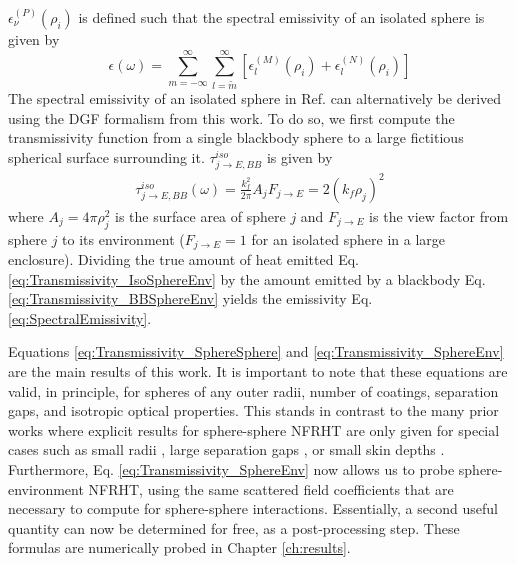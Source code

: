 $\epsilon_{\nu}^{(P)}(\rho_{i})$ is defined such that the spectral emissivity of an isolated sphere\cite{Kattawar1970} is given by
%
\begin{equation}\label{eq:SpectralEmissivity}
\epsilon\left( \omega \right)
= \sum\limits_{m=-\infty}^{\infty} \sum\limits_{l=\widetilde{m}}^{\infty}
\left[ \epsilon_{l}^{(M)}(\rho_{i}) + \epsilon_{l}^{(N)}(\rho_{i}) \right]
\end{equation}
%
The spectral emissivity of an isolated sphere in Ref.  can alternatively be derived using the DGF formalism from this work. To do so, we first compute the transmissivity function from a single blackbody sphere to a large fictitious spherical surface surrounding it. $\tau_{j \rightarrow E, BB}^{iso}$ is given by\cite{Narayanaswamy2013a} 
%
\begin{equation}\label{eq:Transmissivity_BBSphereEnv}
\begin{split}
\tau_{j \rightarrow E, BB}^{iso} (\omega) = \frac{k_{f}^{2}}{2 \pi} A_{j} F_{j \rightarrow E}
= 2 \left( k_{f} \rho_{j} \right)^{2}
\end{split}
\end{equation}
%
where $A_{j} = 4 \pi \rho_{j}^{2}$ is the surface area of sphere $j$ and $F_{j \rightarrow E}$ is the view factor from sphere $j$ to its environment ($F_{j \rightarrow E}=1$ for an isolated sphere in a large enclosure). Dividing the true amount of heat emitted Eq. \ref{eq:Transmissivity_IsoSphereEnv} by the amount emitted by a blackbody Eq. \ref{eq:Transmissivity_BBSphereEnv} yields the emissivity Eq. \ref{eq:SpectralEmissivity}.

Equations \ref{eq:Transmissivity_SphereSphere} and \ref{eq:Transmissivity_SphereEnv} are the main results of this work. It is important to note that these equations are valid, in principle, for spheres of any outer radii, number of coatings, separation gaps, and isotropic optical properties. This stands in contrast to the many prior works where explicit results for sphere-sphere NFRHT are only given for special cases such as small radii \cite{Joulain2005, Ben-Abdallah2011, Dong2017a, Nikbakht2018}, large separation gaps \cite{Kruger2012}, or small skin depths \cite{Volokitin2001, Sasihithlu2011}. Furthermore, Eq. \ref{eq:Transmissivity_SphereEnv} now allows us to probe sphere-environment NFRHT, using the same scattered field coefficients that are necessary to compute for sphere-sphere interactions. Essentially, a second useful quantity can now be determined for free, as a post-processing step. These formulas are numerically probed in Chapter \ref{ch:results}.

